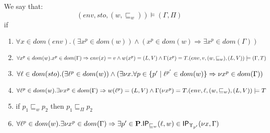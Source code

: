 \documentclass{llncs}
\newcommand{\sqleq}{\ensuremath{\sqsubseteq\xspace}}
\newcommand{\IP}{\ensuremath{\textsf{IP}}\xspace}
\begin{document}

\begin{definition}\label{def:EnvAgree}
	We say that:
	$$(env,sto,(w,\sqleq_w))\models(\Gamma,\Pi)$$
	if 
	\begin{enumerate}
		\item \label{prop:1} $\forall x\in dom(env).(\exists x^p\in dom(w))\wedge(x^p\in dom(w)\Rightarrow \exists x^p\in dom(\Gamma))$
		\item \label{prop:2} $\forall x^p\in dom(w).x^p\in dom(\Gamma)\Rightarrow env(x)=v\wedge w(x^p)=(L,V)\wedge\Gamma(x^p)=T.\\(env,v,(w,\sqleq_w),(L,V))\models (\Gamma,T)$
		\item \label{prop:3} $\forall \ell\in dom(sto).(\exists \ell^p\in dom(w))\wedge(\exists \nu x.\forall p\in\{p'\mid\ell^{p'}\in dom(w)\}\Rightarrow\\\nu x^p\in dom(\Gamma))$
		\item \label{prop:4} $\forall \loc^p \in dom(w).\exists\nu x^{p}\in dom(\Gamma)\Rightarrow w(\loc^p)=(L,V)\wedge\Gamma(\nu x^{p})=\\T.(env,\loc,(w,\sqleq_w),(L,V))\models T$
		\item \label{prop:5} if $p_1\sqleq_w p_2$ then $p_1\sqleq_\Pi p_2$
	\item \label{prop:6} $\forall \loc^p\in dom(w).\exists \nu
          x^p\in dom(\Gamma)\Rightarrow\exists
          p'\in\cat{P}.\IP_{\sqleq_w}(\loc,w)\in
          \IP_{\Upsilon_{p'}}(\nu x,\Gamma)$ 
	\end{enumerate}
\end{definition}

\end{document}
